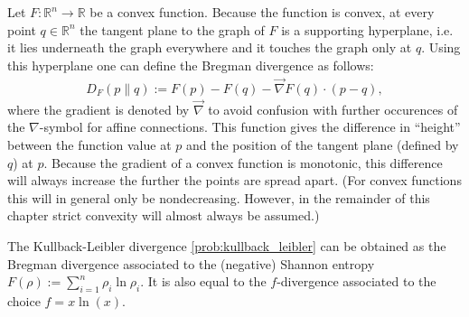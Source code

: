     \begin{definition}\label{info:bregman_divergence}
        Let $F:\mathbb{R}^n\rightarrow\mathbb{R}$ be a convex function. Because the function is convex, at every point $q\in\mathbb{R}^n$ the tangent plane to the graph of $F$ is a supporting hyperplane, i.e. it lies underneath the graph everywhere and it touches the graph only at $q$. Using this hyperplane one can define the Bregman divergence as follows:
        \begin{gather}
            D_F(p\|q) := F(p) - F(q) - \vec{\nabla}F(q)\cdot(p-q),
        \end{gather}
        where the gradient is denoted by $\vec{\nabla}$ to avoid confusion with further occurences of the $\nabla$-symbol for affine connections. This function gives the difference in ``height'' between the function value at $p$ and the position of the tangent plane (defined by $q$) at $p$. Because the gradient of a convex function is monotonic, this difference will always increase the further the points are spread apart. (For convex functions this will in general only be nondecreasing. However, in the remainder of this chapter strict convexity will almost always be assumed.)
    \end{definition}
    \begin{example}
        The Kullback-Leibler divergence \ref{prob:kullback_leibler} can be obtained as the Bregman divergence associated to the (negative) Shannon entropy $F(\rho) := \sum_{i=1}^n\rho_i\ln\rho_i$. It is also equal to the $f$-divergence associated to the choice $f=x\ln(x)$.
    \end{example}

